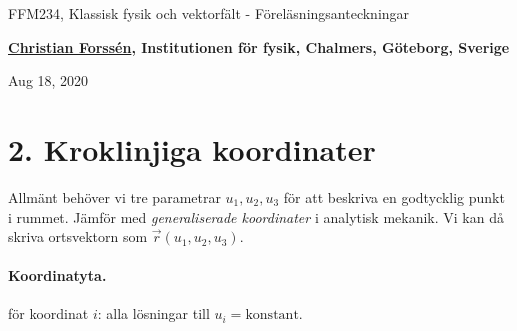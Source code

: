\documentclass[%
oneside,                 %
final,                   %
10pt]{article}
\begin{document}

\newcommand{\exercisesection}[1]{\subsection*{#1}}







\thispagestyle{empty}

\begin{center}
{\LARGE\bf
\begin{spacing}{1.25}
FFM234, Klassisk fysik och vektorfält - Föreläsningsanteckningar
\end{spacing}
}
\end{center}


\begin{center}
{\bf \href{{http://fy.chalmers.se/subatom/tsp/}}{Christian Forssén}, Institutionen för fysik, Chalmers, Göteborg, Sverige${}^{}$} \\ [0mm]
\end{center}

\begin{center}
\end{center}
    

\begin{center}
Aug 18, 2020
\end{center}

\vspace{1cm}


\section*{2. Kroklinjiga koordinater}

Allmänt behöver vi tre parametrar $u_1, u_2, u_3$ för att beskriva en godtycklig punkt i rummet. Jämför med \emph{generaliserade koordinater} i analytisk mekanik. Vi kan då skriva ortsvektorn som $\vec{r}(u_1, u_2, u_3)$.  

\paragraph{Koordinatyta.}
för koordinat $i$: alla lösningar till $u_i = \mathrm{konstant}$.
\end{document}

